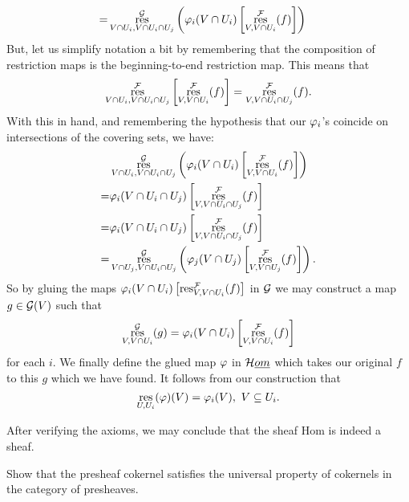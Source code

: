 \documentclass[12pt]{memoir}
\begin{document}
\begin{ptcbr}
\begin{enumerate}[i)]
\begin{align*}
=&\operatorname*{res}^{\mathcal{G}}_{V\cap U_i,V\cap U_i\cap U_j}\left(\varphi_i(V\cap U_i)\left\lbrack\operatorname*{res}^{\mathcal{F}}_{V,V\cap U_i}(f)\right\rbrack\right)
\end{align*}
But, let us simplify notation a bit by remembering that the composition of restriction maps is the beginning-to-end restriction map. This means that 
$$\operatorname*{res}^{\mathcal{F}}_{V\cap U_i,V\cap U_i\cap U_j}\left\lbrack\operatorname*{res}^{\mathcal{F}}_{V,V\cap U_i}(f)\right\rbrack=\operatorname*{res}^{\mathcal{F}}_{V,V\cap U_i\cap U_j}(f).$$
With this in hand, and remembering the hypothesis that our $\varphi_i$'s coincide on intersections of the covering sets, we have:
\begin{align*}
    &\operatorname*{res}^{\mathcal{G}}_{V\cap U_i,V\cap U_i\cap U_j}\left(\varphi_i(V\cap U_i)\left\lbrack\operatorname*{res}^{\mathcal{F}}_{V,V\cap U_i}(f)\right\rbrack\right)\\
    =&\varphi_i(V\cap U_i\cap U_j)\left\lbrack\operatorname*{res}^{\mathcal{F}}_{V,V\cap U_i\cap U_j}(f)\right\rbrack\\
    =&\varphi_i(V\cap U_i\cap U_j)\left\lbrack\operatorname*{res}^{\mathcal{F}}_{V,V\cap U_i\cap U_j}(f)\right\rbrack\\
    =&\operatorname*{res}^{\mathcal{G}}_{V\cap U_j,V\cap U_i\cap U_j}\left(\varphi_j(V\cap U_j)\left\lbrack\operatorname*{res}^{\mathcal{F}}_{V,V\cap U_j}(f)\right\rbrack\right).
\end{align*}
So by gluing the maps $\varphi_i(V\cap U_i)\left\lbrack\operatorname*{res}^{\mathcal{F}}_{V,V\cap U_i}(f)\right\rbrack$ in $\mathcal{G}$ we may construct a map $g\in\mathcal{G}(V)$ such that 
$$\operatorname*{res}_{V,V\cap U_i}^{\mathcal{G}}(g)=\varphi_i(V\cap U_i)\left\lbrack\operatorname*{res}^{\mathcal{F}}_{V,V\cap U_i}(f)\right\rbrack$$
for each $i$. We finally define the glued map $\varphi$ in $\mathcal{H}\emph{om}$ which takes our original $f$ to this $g$ which we have found. It follows from our construction that 
$$\operatorname*{res}_{U,U_i}(\varphi)(V)=\varphi_i(V),\ V\subseteq U_i.$$
\end{enumerate}
After verifying the axioms, we may conclude that the sheaf Hom is indeed a sheaf. 
\end{ptcbr}

\begin{Ej}
Show that the presheaf cokernel satisfies the universal property of cokernels in the category of presheaves.
 \end{Ej}
\end{document}
